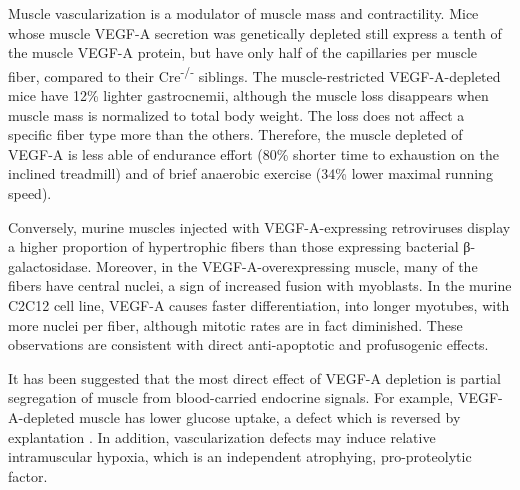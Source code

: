 \documentclass[12pt,english]{report}\usepackage[]{graphicx}\usepackage[]{color}
\begin{document}
Muscle vascularization is a modulator of muscle mass and contractility.
Mice whose muscle VEGF-A secretion was genetically depleted still
express a tenth of the muscle VEGF-A protein, but have only half of
the capillaries per muscle fiber, compared to their Cre\textsuperscript{-/-}
siblings\citep{olfert2009muscle-specific}. The muscle-restricted
VEGF-A-depleted mice have 12\% lighter gastrocnemii, although the
muscle loss disappears when muscle mass is normalized to total body
weight. The loss does not affect a specific fiber type more than the
others. Therefore, the muscle depleted of VEGF-A is less able of endurance
effort (80\% shorter time to exhaustion on the inclined treadmill)
and of brief anaerobic exercise (34\% lower maximal running speed).

Conversely, murine muscles injected with VEGF-A-expressing retroviruses
display a higher proportion of hypertrophic fibers than those expressing
bacterial β-galactosidase\citep{arsic2004vascular}. Moreover, in
the VEGF-A-overexpressing muscle, many of the fibers have central
nuclei, a sign of increased fusion with myoblasts. In the murine C2C12
cell line, VEGF-A causes faster differentiation, into longer myotubes,
with more nuclei per fiber, although mitotic rates are in fact diminished.
These observations are consistent with direct anti-apoptotic and profusogenic
effects.

It has been suggested that the most direct effect of VEGF-A depletion
is partial segregation of muscle from blood-carried endocrine signals.
For example, VEGF-A-depleted muscle has lower glucose uptake, a defect
which is reversed by explantation \citep{bonner2013muscle-specific}.
In addition, vascularization defects may induce relative intramuscular
hypoxia, which is an independent atrophying, pro-proteolytic factor\citep{detheije2015differential}.
\end{document}
